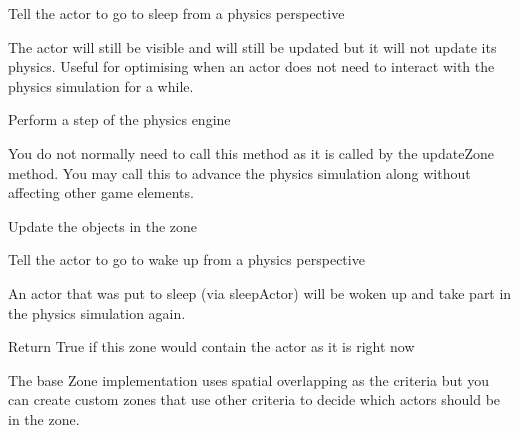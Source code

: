 \documentclass[letterpaper,10pt,english]{sphinxmanual}
\begin{document}
\begin{fulllineitems}
\begin{fulllineitems}
\end{fulllineitems}


\begin{fulllineitems}
\label{zone:serge.zone.Zone.sleepActor}
Tell the actor to go to sleep from a physics perspective

The actor will still be visible and will still be updated but it
will not update its physics. Useful for optimising when an actor
does not need to interact with the physics simulation for a while.

\end{fulllineitems}


\begin{fulllineitems}
\label{zone:serge.zone.Zone.updatePhysics}
Perform a step of the physics engine

You do not normally need to call this method as it is called by the
updateZone method. You may call this to advance the physics simulation
along without affecting other game elements.

\end{fulllineitems}


\begin{fulllineitems}
\label{zone:serge.zone.Zone.updateZone}
Update the objects in the zone

\end{fulllineitems}


\begin{fulllineitems}
\label{zone:serge.zone.Zone.wakeActor}
Tell the actor to go to wake up from a physics perspective

An actor that was put to sleep (via sleepActor) will be woken
up and take part in the physics simulation again.

\end{fulllineitems}


\begin{fulllineitems}
\label{zone:serge.zone.Zone.wouldContain}
Return True if this zone would contain the actor as it is right now

The base Zone implementation uses spatial overlapping as the criteria but you
can create custom zones that use other criteria to decide which actors should
be in the zone.

\end{fulllineitems}


\end{fulllineitems}
\end{document}

